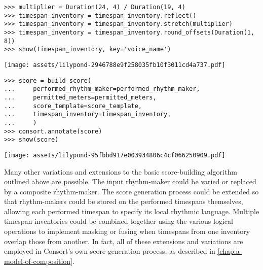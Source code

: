 \begin{singlespacing}
\vspace{-0.5\baselineskip}
\begin{lstlisting}
>>> multiplier = Duration(24, 4) / Duration(19, 4)
>>> timespan_inventory = timespan_inventory.reflect()
>>> timespan_inventory = timespan_inventory.stretch(multiplier)
>>> timespan_inventory = timespan_inventory.round_offsets(Duration(1, 8))
>>> show(timespan_inventory, key='voice_name')
\end{lstlisting}
\noindent\texttt{[image: assets/lilypond-2946788e9f258035fb10f3011cd4a737.pdf]}
\begin{lstlisting}
>>> score = build_score(
...     performed_rhythm_maker=performed_rhythm_maker,
...     permitted_meters=permitted_meters,
...     score_template=score_template,
...     timespan_inventory=timespan_inventory,
...     )
>>> consort.annotate(score)
>>> show(score)
\end{lstlisting}
\noindent\texttt{[image: assets/lilypond-95fbbd917e003934806c4cf066250909.pdf]}
\end{singlespacing}

\noindent Many other variations and extensions to the basic score-building
algorithm outlined above are possible. The input rhythm-maker could be varied
or replaced by a composite rhythm-maker. The score generation process could be
extended so that rhythm-makers could be stored on the performed timespans
themselves, allowing each performed timespan to specify its local rhythmic
language. Multiple timespan inventories could be combined together using the
various logical operations to implement masking or fusing when timespans from
one inventory overlap those from another. In fact, all of these extensions and
variations are employed in Consort's own score generation process, as described
in \autoref{chap:a-model-of-composition}.